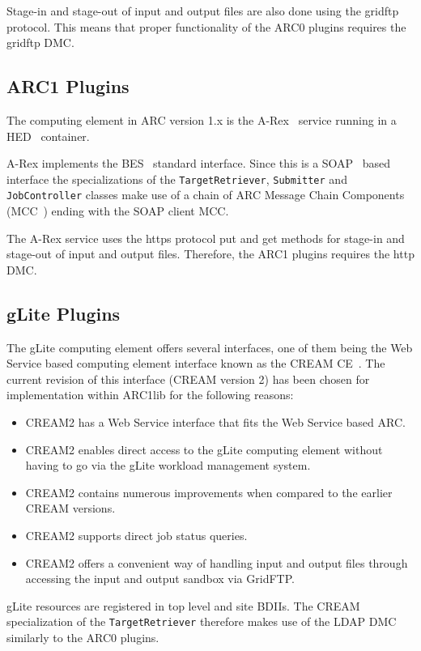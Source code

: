 \documentclass{book}
\newcommand{\TargetRetriever}{\texttt{TargetRetriever}}
\newcommand{\Submitter}{\texttt{Submitter}}
\newcommand{\JobController}{\texttt{JobController}}
\begin{document}
Stage-in and stage-out of input and output files are also done using
the gridftp~\cite{gridftp} protocol. This means that proper functionality of the ARC0
plugins requires the gridftp DMC.

\subsection{ARC1 Plugins}
The computing element in ARC version 1.x is the A-Rex~\cite{arex} service running
in a HED~\cite{hed} container.

A-Rex implements the BES~\cite{ogsa-bes} standard interface. Since this is a SOAP~\cite{soap}
based interface the specializations of the {\TargetRetriever},
{\Submitter} and {\JobController} classes make use of a chain of ARC Message Chain Components 
(MCC~\cite{hed}) ending with the SOAP client MCC.

The A-Rex service uses the https protocol put and get methods for
stage-in and stage-out of input and output files. Therefore, the ARC1
plugins requires the http DMC.

\subsection{gLite Plugins}
The gLite computing element offers several interfaces, one of them being the Web Service based 
computing element interface known as the CREAM CE~\cite{cream}. The current revision of this 
interface (CREAM version 2) has been chosen for implementation within ARC1lib for the following 
reasons:

\begin{itemize}
\item CREAM2 has a Web Service interface that fits the Web Service based ARC.
\item CREAM2 enables direct access to the gLite computing element without having to go via the gLite workload management system.
\item CREAM2 contains numerous improvements when compared to the earlier CREAM versions.
\item CREAM2 supports direct job status queries.
\item CREAM2 offers a convenient way of handling input and output files through accessing the input and output sandbox via GridFTP.
\end{itemize}

gLite resources are registered in top level and site BDIIs. The CREAM
specialization of the {\TargetRetriever} therefore makes use of the
LDAP DMC similarly to the ARC0 plugins.
\end{document}
